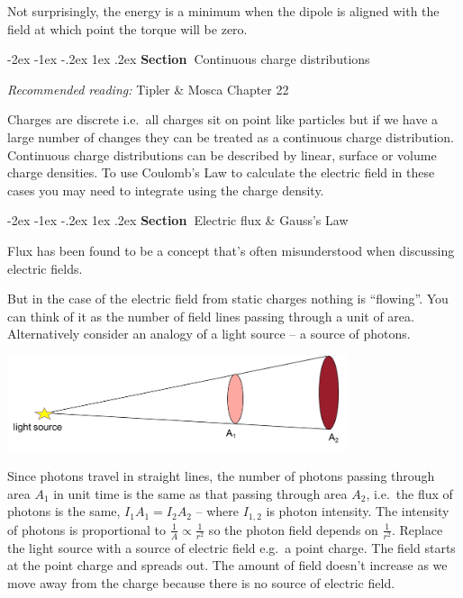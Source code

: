 \documentclass[
]{book}
\makeatletter
\renewcommand\section{%
\@startsection{section}{1}{\z@}%
              {-2ex \@plus -1ex \@minus -.2ex}%
              {1ex \@plus .2ex}%
              {\sffamily\bfseries\large\noindent Section~}}
\numberwithin{equation}{section}
\makeatother
\begin{document}
Not surprisingly, the energy is a minimum when the dipole is aligned
with the field at which point the torque will be zero.

\hypertarget{continuous-charge-distributions}{%
\section{Continuous charge distributions}\label{continuous-charge-distributions}}

\emph{Recommended reading:} Tipler \& Mosca Chapter 22

Charges are discrete i.e.~all charges sit on point like particles but if
we have a large number of changes they can be treated as a continuous
charge distribution. Continuous charge distributions can be described by
linear, surface or volume charge densities. To use Coulomb's Law to
calculate the electric field in these cases you may need to integrate
using the charge density.

\hypertarget{electric-flux-gausss-law}{%
\section{Electric flux \& Gauss's Law}\label{electric-flux-gausss-law}}

Flux has been found to be a concept that's often misunderstood when
discussing electric fields.

But in the case of the electric field from static charges nothing is
``flowing''. You can think of it as the number of field lines passing
through a unit of area. Alternatively consider an analogy of a light
source -- a source of photons.

\includegraphics[width=100mm,height=\textheight]{Figures/lightFlux.png} \protect\hypertarget{fig:lightFlux}{}{}

Since photons travel in straight lines, the number of photons passing
through area \(A_1\) in unit time is the same as that passing through area
\(A_2\), i.e.~the flux of photons is the same, \(I_1 A_1 = I_2 A_2\) --
where \(I_{1,2}\) is photon intensity. The intensity of photons is
proportional to \(\frac{1}{A} \propto \frac{1}{r^2}\) so the photon field
depends on \(\frac{1}{r^2}\). Replace the light source with a source of
electric field e.g.~a point charge. The field starts at the point charge
and spreads out. The amount of field doesn't increase as we move away
from the charge because there is no source of electric field.
\end{document}
